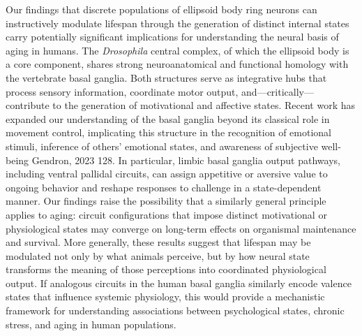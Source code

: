 

Our findings that discrete populations of ellipsoid body ring neurons can instructively modulate lifespan through the generation of distinct internal states carry potentially significant implications for understanding the neural basis of aging in humans. The \textit{Drosophila} central complex, of which the ellipsoid body is a core component, shares strong neuroanatomical and functional homology with the vertebrate basal ganglia. Both structures serve as integrative hubs that process sensory information, coordinate motor output, and—critically—contribute to the generation of motivational and affective states. Recent work has expanded our understanding of the basal ganglia beyond its classical role in movement control, implicating this structure in the recognition of emotional stimuli, inference of others' emotional states, and awareness of subjective well-being {Gendron, 2023 128}. In particular, limbic basal ganglia output pathways, including ventral pallidal circuits, can assign appetitive or aversive value to ongoing behavior and reshape responses to challenge in a state-dependent manner. Our findings raise the possibility that a similarly general principle applies to aging: circuit configurations that impose distinct motivational or physiological states may converge on long-term effects on organismal maintenance and survival. More generally, these results suggest that lifespan may be modulated not only by what animals perceive, but by how neural state transforms the meaning of those perceptions into coordinated physiological output. If analogous circuits in the human basal ganglia similarly encode valence states that influence systemic physiology, this would provide a mechanistic framework for understanding associations between psychological states, chronic stress, and aging in human populations.

